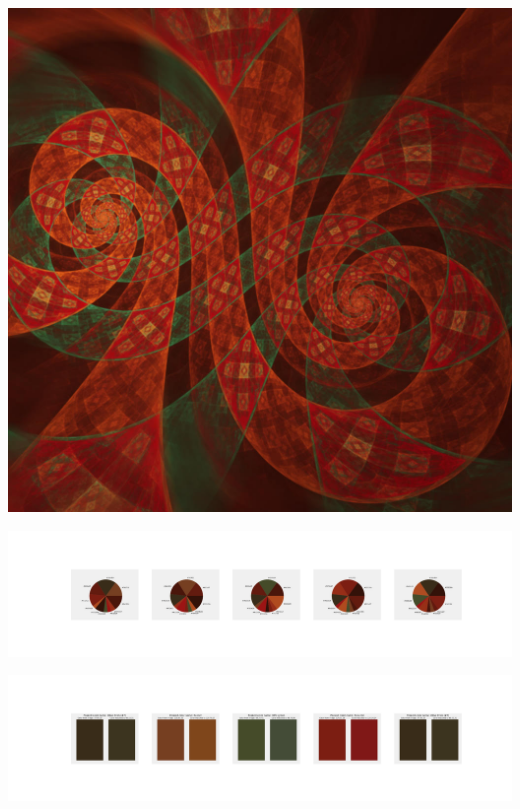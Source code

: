 \documentclass[11pt]{article}
\begin{document}
\begin{landscape}
    \begin{center}
    \includegraphics[width=\textwidth]{./nbimg/file (192).jpg}
    \end{center}

    \begin{center}
    \includegraphics[width=250mm]{./nbimg/pie-103.jpg}
    \end{center}

    \begin{center}
    \includegraphics[width=250mm]{./nbimg/peak-103.jpg}
    \end{center}
    


\end{landscape}
\end{document}
